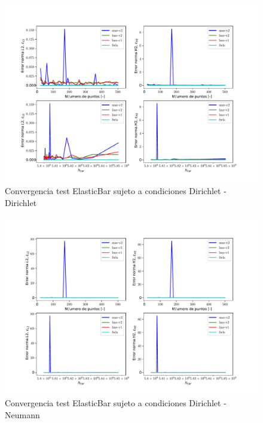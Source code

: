 \begin{figure}
    \centering
    \includegraphics[width=1\textwidth]{./Imagenes/06/comparacion_shp_irreg/ElasticBar_irreg_type-2_caso-1_direct_dgesv-lapack-blas_sme-v2_lme-v2_lme-v1_fwls.pdf}
    \caption{Convergencia test ElasticBar sujeto a condiciones Dirichlet - Dirichlet} \label{fig:ElasticBar_caso-1_conv_irreg}
\end{figure}
\begin{figure}
    \centering
    \includegraphics[width=1\textwidth]{./Imagenes/06/comparacion_shp_irreg/ElasticBar_irreg_type-2_caso-2_direct_dgesv-lapack-blas_sme-v2_lme-v2_lme-v1_fwls.pdf}
    \caption{Convergencia test ElasticBar sujeto a condiciones Dirichlet - Neumann} \label{fig:ElasticBar_caso-2_conv_irreg}
\end{figure}
